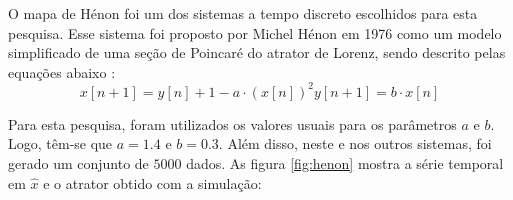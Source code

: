 \documentclass{article}
\begin{document}
O mapa de Hénon foi um dos sistemas a tempo discreto escolhidos para esta pesquisa. Esse sistema foi proposto por Michel Hénon em 1976 como um modelo simplificado de uma seção de Poincaré do atrator de Lorenz, sendo descrito pelas equações abaixo \cite{henon1976two}:
\begin{subequations}
\begin{equation}
x[n+1] = y[n] + 1 - a\cdot (x[n])^2
\end{equation}
\begin{equation}
y[n+1] = b \cdot x[n]
\end{equation}
\end{subequations}

Para esta pesquisa, foram utilizados os valores usuais para os parâmetros $a$ e $b$. Logo, têm-se que $a = 1.4$ e $b = 0.3$. Além disso, neste e nos outros sistemas, foi gerado um conjunto de $5000$ dados. As figura \ref{fig:henon} mostra a série temporal em $\hat{x}$ e o atrator obtido com a simulação:
\end{document}
